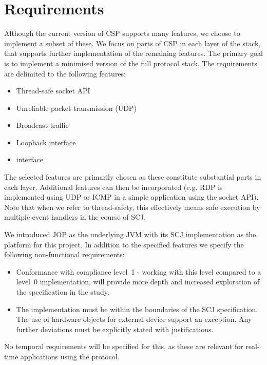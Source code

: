 \section{Requirements}
Although the current version of CSP supports many features, we choose to implement a subset of these. We focus on parts of CSP in each layer of the stack, that supports further implementation of the remaining features. The primary goal is to implement a minimised version of the full protocol stack. The requirements are delimited to the following features:

\begin{itemize}
	\item Thread-safe socket API
	\item Unreliable packet transmission (UDP)
	\item Broadcast traffic
	\item Loopback interface
	\item \iic interface
\end{itemize}

The selected features are primarily chosen as these constitute substantial parts in each layer. Additional features can then be incorporated (e.g. RDP is implemented using UDP or ICMP in a simple application using the socket API).
Note that when we refer to thread-safety, this effectively means safe execution by multiple event handlers in the course of SCJ.

We introduced JOP as the underlying JVM with its SCJ implementation as the platform for this project. In addition to the specified features we specify the following non-functional requirements:

\begin{itemize}
	\item Conformance with compliance level~1 - working with this level compared to a level~0 implementation, will provide more depth and increased exploration of the specification in the study.
	\item The implementation must be within the boundaries of the SCJ specification. The use of hardware objects for external device support an exception. Any further deviations must be explicitly stated with justifications.
\end{itemize}

No temporal requirements will be specified for this, as these are relevant for \mbox{real-time} applications using the protocol.